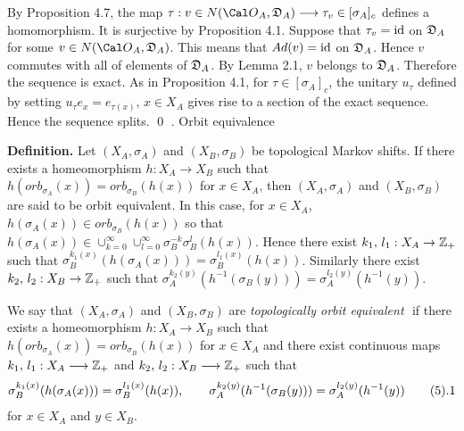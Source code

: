 By Proposition 4.7, the map
$\tau: v \in N(\OA,\DA)
\longrightarrow 
\tau_v \in [\sigma_A ]_c
$
defines a homomorphism.
It is   surjective
by Proposition 4.1.
Suppose that $\tau_v ={{\operatorname{id}}} $ on ${{\frak D}_A}$ 
for some $v \in N(\OA,\DA)$.
This means that $Ad(v) ={{\operatorname{id}}} $
on
${{\frak D}_A}$.
Hence $v$ commutes 
with all of elements of ${{\frak D}_A}$.
By Lemma 2.1, $v$ belongs to ${{\frak D}_A}$.
Therefore the sequence is exact.
As in Proposition 4.1,
for $\tau \in [\sigma_A]_c$,
the unitary $u_\tau$ defined by setting
$u_\tau e_x = e_{\tau(x)}, \, x \in X_A$ 
gives rise to a section of the exact sequence.
Hence the sequence splits.
\qed
\enddemo
. Orbit equivalence
\endheading

\noindent
{\bf Definition.}
Let $(X_A, \sigma_A)$ and $(X_B,\sigma_B)$ be topological Markov shifts.
If there exists a homeomorphism 
$h:X_A \rightarrow X_B$ such that 
$h(orb_{\sigma_A}(x)) = orb_{\sigma_B}(h(x))$ for $x \in X_A$,
then 
$(X_A, \sigma_A)$ and $(X_B,\sigma_B)$ are said to be orbit equivalent.
In this case, for $x \in X_A$,
$h(\sigma_A(x)) \in orb_{\sigma_B}(h(x))$
so that 
$h(\sigma_A(x)) \in 
\cup_{k=0}^\infty \cup_{l=0}^\infty \sigma_B^{-k}\sigma_B^{l}(h(x))$.
Hence
there exist $k_1,\, l_1:X_A \rightarrow { {\Bbb Z}_+ }$
such that
$\sigma_B^{k_1(x)} (h(\sigma_A(x))) = \sigma_B^{l_1(x)}(h(x)) $.
Similarly 
there exist $k_2,\, l_2:X_B \rightarrow { {\Bbb Z}_+ }$
such that
$\sigma_A^{k_2(y)} (h^{-1}(\sigma_B(y))) = \sigma_A^{l_2(y)}(h^{-1}(y)) $.
 
We say that 
$(X_A, \sigma_A)$ and $(X_B,\sigma_B)$  
are
 {\it topologically orbit equivalent}\,\
if there exists a homeomorphism 
$h:X_A \rightarrow X_B$ such that 
$h(orb_{\sigma_A}(x)) = orb_{\sigma_B}(h(x))$ for $x \in X_A$
and
there exist 
continuous maps
$k_1,\, l_1:X_A \longrightarrow { {\Bbb Z}_+ }$
and
$k_2,\, l_2:X_B \longrightarrow { {\Bbb Z}_+ }$
such that
$$
\sigma_B^{k_1(x)} (h(\sigma_A(x))) = \sigma_B^{l_1(x)}(h(x)),
\qquad
\sigma_A^{k_2(y)} (h^{-1}(\sigma_B(y))) = \sigma_A^{l_2(y)}(h^{-1}(y)) 
\tag 5.1
$$
for $x \in X_A$ and $y \in X_B$.

